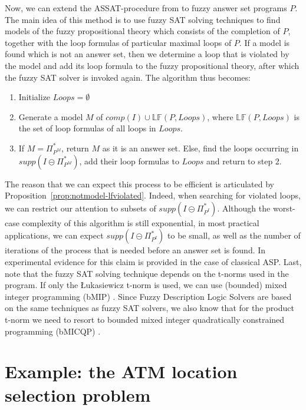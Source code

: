 \documentclass{tlp}
\newcommand{\comp}[1]{\ensuremath{comp(#1)}}
\newcommand{\loopform}[2]{\mathbb{LF}(#1,#2)}
\newcommand{\supp}[1]{\ensuremath{\mathit{supp}(#1)}}
\newcommand{\fsetminus}{\circleddash}
\newcommand{\nfimcons}[1]{\Pi_{#1}}
\newcommand{\lfpnfimcons}[1]{\nfimcons{#1}^{*}}
\begin{document}
Now, we can extend the ASSAT-procedure from \cite{assat-linzhao} to fuzzy answer set programs $P$. The main idea of this method is to use fuzzy SAT solving techniques to find models of the fuzzy propositional theory which consists of the completion of $P$, together with the loop formulas of particular maximal loops of $P$. If a model is found which is not an answer set, then we determine a loop that is violated by the model and add its loop formula to the fuzzy propositional theory, after which the fuzzy SAT solver is invoked again. The algorithm thus becomes:

\begin{enumerate}
 \item Initialize $Loops = \emptyset$
 \item Generate a model $M$ of $\comp{I} \cup \loopform{P}{Loops}$, where $\loopform{P}{Loops}$ is the set of loop formulas of all loops in $Loops$.
 \item If $M = \lfpnfimcons{P^M}$, return $M$ as it is an answer set. Else, find the loops occurring in $\supp{I \fsetminus \lfpnfimcons{P^M}}$, add their loop formulas to $Loops$ and return to step 2.
\end{enumerate}

The reason that we can expect this process to be efficient is articulated by Proposition~\ref{prop:notmodel-lfviolated}. Indeed, when searching for violated loops, we can restrict our attention to subsets of $\supp{I \fsetminus \lfpnfimcons{P^I}}$. Although the worst-case complexity of this algorithm is still exponential, in most practical applications, we can expect $\supp{I \fsetminus \lfpnfimcons{P^I}}$ to be small, as well as the number of iterations of the process that is needed before an answer set is found. In \cite{assat-linzhao} experimental evidence for this claim is provided in the case of classical ASP. Last, note that the fuzzy SAT solving technique depends on the t-norms used in the program. If only the \L ukasiewicz t-norm is used, we can use (bounded) mixed integer programming (bMIP) \cite{ManyValuedMixedInteger}. Since Fuzzy Description Logic Solvers are based on the same techniques as fuzzy SAT solvers, we also know that for the
product t-norm we need to resort to bounded mixed integer quadratically constrained programming (bMICQP) \cite{BobilloStraccia}.





\section{Example: the ATM location selection problem}\label{sec:example}
\end{document}
